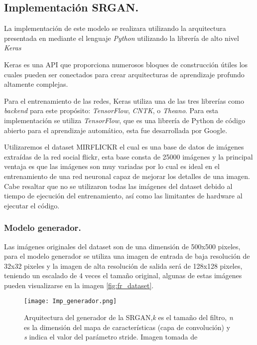 \subsection{Implementación SRGAN.}

La implementación de este modelo se realizara utilizando la arquitectura presentada
en \cite{SRGAN} mediante el lenguaje \emph{Python} utilizando la librería de alto nivel \emph{Keras}

Keras es una API que proporciona numerosos bloques
de construcción útiles los cuales pueden ser conectados para crear arquitecturas de
aprendizaje profundo altamente complejas.

Para el entrenamiento de las redes, Keras utiliza una de las tres librerías como
\emph{backend} para este propósito: \emph{TensorFlow}, \emph{CNTK}, o \emph{Theano}. Para esta implementación
se utiliza \emph{TensorFlow}, que es una librería de Python de código abierto para el
aprendizaje automático, esta fue desarrollada por Google.

Utilizaremos el dataset MIRFLICKR \cite{MIRFLICKR} el cual es una base de datos de imágenes
extraídas de la red social flickr, esta base consta de 25000 imágenes y la principal ventaja es 
que las imágenes son muy variadas por lo cual es ideal en el entrenamiento de una red neuronal capaz 
de mejorar los detalles de una imagen. Cabe resaltar que no se utilizaron todas las imágenes del dataset
debido al tiempo de ejecución del entrenamiento, así como las limitantes de hardware al ejecutar el código.



\subsubsection{Modelo generador.}

Las imágenes originales del dataset son de una dimensión de 500x500 pixeles, para el modelo generador
se utiliza una imagen de entrada de baja resolución de 32x32 pixeles y la imagen de alta resolución de salida
será de 128x128 pixeles, teniendo un escalado de 4 veces el tamaño original, algunas de estas imágenes pueden
visualizarse en la imagen \ref{fig:fr_dataset}.






\begin{figure}[H]
  \begin{center}
    \texttt{[image: Imp\_generador.png]}
    \caption{Arquitectura del generador de la SRGAN,\emph{k} es el tamaño del
    filtro, \emph{n} es la dimensión del mapa de características (capa de convolución) y \emph{s} indica
    el valor del parámetro stride. Imagen tomada de \cite{SRGAN}}
    \label{Alexis4}
  \end{center}
\end{figure}

